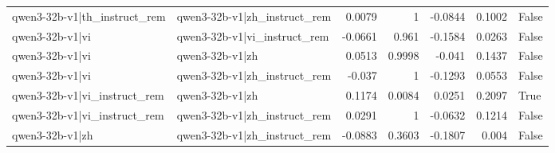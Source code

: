 \begin{table}
\begin{tabular}{l l r r r r l}
qwen3-32b-v1|th_instruct_rem & qwen3-32b-v1|zh_instruct_rem & 0.0079 & 1 & -0.0844 & 0.1002 & False \\
qwen3-32b-v1|vi & qwen3-32b-v1|vi_instruct_rem & -0.0661 & 0.961 & -0.1584 & 0.0263 & False \\
qwen3-32b-v1|vi & qwen3-32b-v1|zh & 0.0513 & 0.9998 & -0.041 & 0.1437 & False \\
qwen3-32b-v1|vi & qwen3-32b-v1|zh_instruct_rem & -0.037 & 1 & -0.1293 & 0.0553 & False \\
qwen3-32b-v1|vi_instruct_rem & qwen3-32b-v1|zh & 0.1174 & 0.0084 & 0.0251 & 0.2097 & True \\
qwen3-32b-v1|vi_instruct_rem & qwen3-32b-v1|zh_instruct_rem & 0.0291 & 1 & -0.0632 & 0.1214 & False \\
qwen3-32b-v1|zh & qwen3-32b-v1|zh_instruct_rem & -0.0883 & 0.3603 & -0.1807 & 0.004 & False \\
\bottomrule
\end{tabular}
\end{table}
